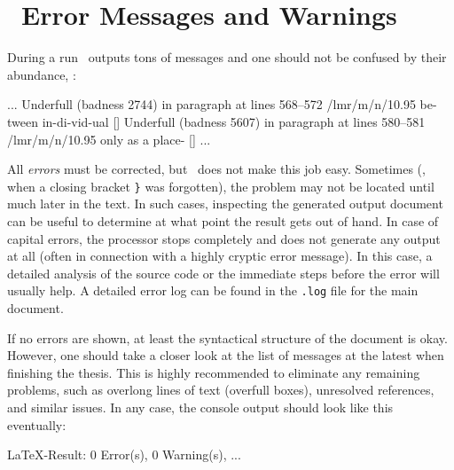 \section{\latex\ Error Messages and Warnings}

During a run \latex\ outputs tons of messages and one should not be
confused by their abundance, \eg:

\begin{GenericCode}[numbers=none]
...
Underfull \hbox (badness 2744) in paragraph at lines 568--572
/lmr/m/n/10.95 be-tween in-di-vid-ual
[]
Underfull \hbox (badness 5607) in paragraph at lines 580--581
/lmr/m/n/10.95 only as a place-
[]
...
\end{GenericCode}

\noindent
All \emph{errors} must be corrected, but \latex\ does not make this job easy.
Sometimes (\eg, when a closing bracket \verb!}! was forgotten), the problem may
not be located until much later in the text. In such cases, inspecting the
generated output document can be useful to determine at what point the result
gets out of hand. In case of capital errors, the \latex processor stops
completely and does not generate any output at all (often in connection with a highly
cryptic error message). In this case, a detailed analysis of the source code or
the immediate steps before the error will usually help. A detailed error log can be
found in the \verb!.log! file for the main document.

If no errors are shown, at least the syntactical structure of the document is
okay. However, one should take a closer look at the list of messages at the
latest when finishing the thesis. This is highly recommended to eliminate any
remaining problems, such as overlong lines of text (overfull boxes), unresolved
references, and similar issues. In any case, the console output should look like 
this eventually:
%
\begin{GenericCode}[numbers=none]
LaTeX-Result: 0 Error(s), 0 Warning(s), ...
\end{GenericCode}
